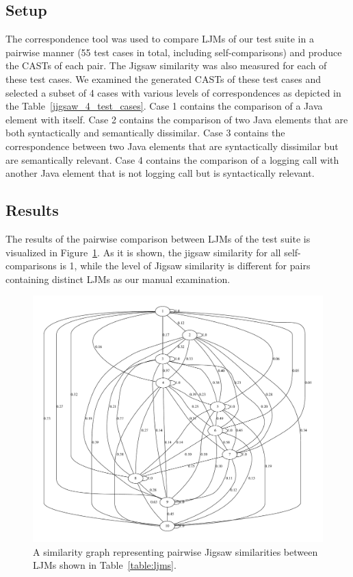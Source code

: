 \subsection{Setup}  \label{study1-setup}
The correspondence tool was used to compare LJMs of our test suite in a pairwise manner (55 test cases in total, including self-comparisons) and produce the CASTs of each pair. The Jigsaw similarity was also measured for each of these test cases.
We examined the generated CASTs of these test cases and selected a subset of 4 cases with various levels of correspondences as depicted in the Table~\ref{jigsaw_4_test_cases}. Case 1 contains the comparison of a Java element with itself. Case 2 contains the comparison of two Java elements that are both syntactically and semantically dissimilar.  Case 3 contains the correspondence between two Java elements that are syntactically dissimilar but are semantically relevant. Case 4 contains the comparison of a logging call with another Java element that is not logging call but is syntactically relevant.

\subsection{Results}  \label{study1-results}
The results of the pairwise comparison between LJMs of the test suite is visualized in Figure~\ref{fig:jigsaw_graph}. As it is shown, the jigsaw similarity for all self-comparisons is 1, while  the level of Jigsaw similarity is different for pairs containing distinct LJMs as our manual examination.

\begin{figure} [H]
  \centering\includegraphics [width = \textwidth]{graphviz/jigsaw.pdf}
  \caption{A similarity graph representing pairwise Jigsaw similarities between LJMs shown in Table~\ref{table:ljms}.}
  \label{fig:jigsaw_graph}
\end{figure}


